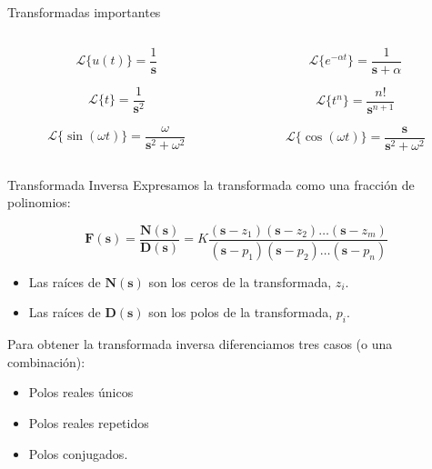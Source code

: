 \documentclass[xcolor={usenames,svgnames,dvipsnames}]{beamer}
\newcommand{\laplace}[1]{\mathbf{#1}(\mathbf{s})}
\newcommand{\slp}{\mathbf{s}}
\begin{document}
\begin{frame}[label={sec:org0d39d7b}]{Transformadas importantes}
\begin{columns}
\begin{column}{0.5\columnwidth}
\[
\mathcal{L}\{u(t)\} = \frac{1}{\slp}
\]

\[
\mathcal{L}\{t\} = \frac{1}{\slp^2}
\]

\[
  \mathcal{L}\{\sin(\omega t)\} = \frac{\omega}{\slp^2 + \omega^2}
\]
\end{column}

\begin{column}{0.5\columnwidth}
\[
\mathcal{L}\{e^{-\alpha t}\} = \frac{1}{\slp + \alpha}
\]


\[
\mathcal{L}\{t^n\} = \frac{n!}{\slp^{ n+1}}
\]

\[
  \mathcal{L}\{\cos(\omega t)\} = \frac{\slp}{\slp^2 + \omega^2}
\]
\end{column}
\end{columns}
\end{frame}

\begin{frame}[label={sec:org7d485e2}]{Transformada Inversa}
Expresamos la transformada como una fracción de polinomios:

\[
  \laplace{F} = \frac{\laplace{N}}{\laplace{D}} = K \frac{(\slp-z_1) (\slp - z_2) \ldots (\slp - z_m)}{(\slp-p_1) (\slp - p_2) \ldots (\slp - p_n)}
\]

\begin{itemize}
\item Las raíces de \(\laplace{N}\) son los \alert{ceros} de la transformada, \(z_i\).
\item Las raíces de \(\laplace{D}\) son los \alert{polos} de la transformada, \(p_i\).
\end{itemize}

\vspace{\baselineskip}

Para obtener la transformada inversa diferenciamos tres casos (o una combinación): 
\begin{itemize}
\item Polos reales únicos
\item Polos reales repetidos
\item Polos conjugados.
\end{itemize}
\end{frame}
\end{document}
